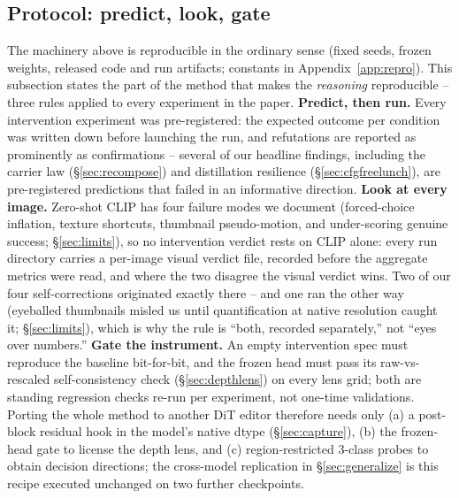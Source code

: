 \documentclass[10pt,twocolumn]{article}
\begin{document}
\subsection{Protocol: predict, look, gate}\label{sec:protocol}
The machinery above is reproducible in the ordinary sense (fixed seeds,
frozen weights, released code and run artifacts; constants in
Appendix~\ref{app:repro}). This subsection states the part of the
method that makes the \emph{reasoning} reproducible -- three rules
applied to every experiment in the paper. \textbf{Predict, then run.}
Every intervention experiment was pre-registered: the expected outcome
per condition was written down before launching the run, and
refutations are reported as prominently as confirmations -- several of
our headline findings, including the carrier law
(\S\ref{sec:recompose}) and distillation resilience
(\S\ref{sec:cfgfreelunch}), are pre-registered predictions that failed
in an informative direction. \textbf{Look at every image.} Zero-shot
CLIP has four failure modes we document (forced-choice inflation,
texture shortcuts, thumbnail pseudo-motion, and under-scoring genuine
success; \S\ref{sec:limits}), so no intervention verdict rests on CLIP
alone: every run directory carries a per-image visual verdict file,
recorded before the aggregate metrics were read, and where the two
disagree the visual verdict wins. Two of our four self-corrections
originated exactly there -- and one ran the other way (eyeballed
thumbnails misled us until quantification at native resolution caught
it; \S\ref{sec:limits}), which is why the rule is ``both, recorded
separately,'' not ``eyes over numbers.'' \textbf{Gate the instrument.}
An empty intervention spec must reproduce the baseline bit-for-bit,
and the frozen head must pass its raw-vs-rescaled self-consistency
check (\S\ref{sec:depthlens}) on every lens grid; both are standing
regression checks re-run per experiment, not one-time validations.
Porting the whole method to another DiT editor therefore needs only
(a) a post-block residual hook in the model's native dtype
(\S\ref{sec:capture}), (b) the frozen-head gate to license the depth
lens, and (c) region-restricted 3-class probes to obtain decision
directions; the cross-model replication in \S\ref{sec:generalize} is
this recipe executed unchanged on two further checkpoints.
\end{document}
